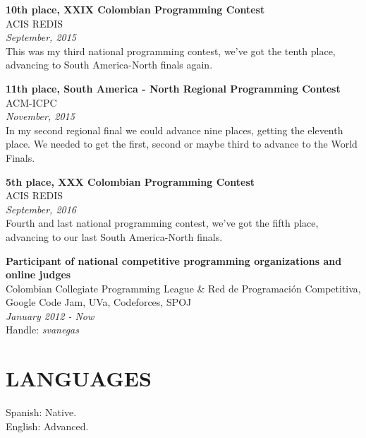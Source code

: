 \documentclass[margin, 10pt]{res} %
\begin{document}
\begin{resume}
\textbf{10th place, XXIX Colombian Programming Contest} \\
ACIS REDIS \\
\textit{September, 2015} \\
This was my third national programming contest, we've got the tenth place, advancing to South
America-North finals again.

\textbf{11th place, South America - North Regional Programming Contest} \\
ACM-ICPC \\
\textit{November, 2015} \\
In my second regional final we could advance nine places, getting the eleventh place.
We needed to get the first, second or maybe third to advance to the World Finals.

\textbf{5th place, XXX Colombian Programming Contest} \\
ACIS REDIS \\
\textit{September, 2016} \\
Fourth and last national programming contest, we've got the fifth place, advancing to our last South
America-North finals.

\textbf{Participant of national competitive programming organizations and online judges} \\
Colombian Collegiate Programming League \& Red de Programación Competitiva, Google Code Jam, UVa,
Codeforces, SPOJ \\
\textit{January 2012 - Now} \\
Handle: {\sl svanegas}


\section{LANGUAGES}
Spanish: Native. \\
English: Advanced.

\end{resume}
\end{document}
